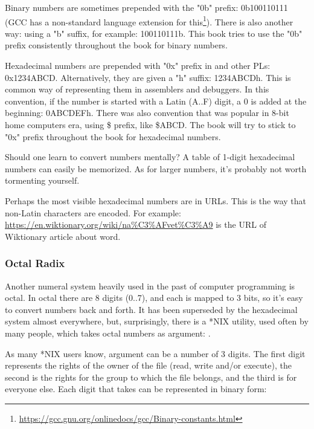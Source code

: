 Binary numbers are sometimes prepended with the "0b" prefix: 0b100110111 (\ac{GCC} has a non-standard language extension for this\footnote{\url{https://gcc.gnu.org/onlinedocs/gcc/Binary-constants.html}}).
There is also another way: using a "b" suffix, for example: 100110111b.
This book tries to use the "0b" prefix consistently throughout the book for binary numbers.

Hexadecimal numbers are prepended with "0x" prefix in \CCpp and other \ac{PL}s: 0x1234ABCD.
Alternatively, they are given a "h" suffix: 1234ABCDh. This is common way of representing them in assemblers and debuggers.
In this convention, if the number is started with a Latin (A..F) digit, a 0 is added at the beginning: 0ABCDEFh.
There was also convention that was popular in 8-bit home computers era, using \$ prefix, like \$ABCD.
The book will try to stick to "0x" prefix throughout the book for hexadecimal numbers.

Should one learn to convert numbers mentally? A table of 1-digit hexadecimal numbers can easily be memorized.
As for larger numbers, it's probably not worth tormenting yourself.

Perhaps the most visible hexadecimal numbers are in \ac{URL}s.
This is the way that non-Latin characters are encoded.
For example:
\url{https://en.wiktionary.org/wiki/na\%C3\%AFvet\%C3\%A9} is the \ac{URL} of Wiktionary article about  word.

\subsubsection{Octal Radix}

Another numeral system heavily used in the past of computer programming is octal. In octal there are 8 digits (0..7), and each is mapped to 3 bits, so it's easy to convert numbers back and forth.
It has been superseded by the hexadecimal system almost everywhere, but, surprisingly, there is a *NIX utility, used often by many people, which takes octal numbers as argument: .

As many *NIX users know,  argument can be a number of 3 digits. The first digit represents the rights of the owner of the file (read, write and/or execute), the second is the rights for the group to which the file belongs, and the third is for everyone else.
Each digit that  takes can be represented in binary form:

